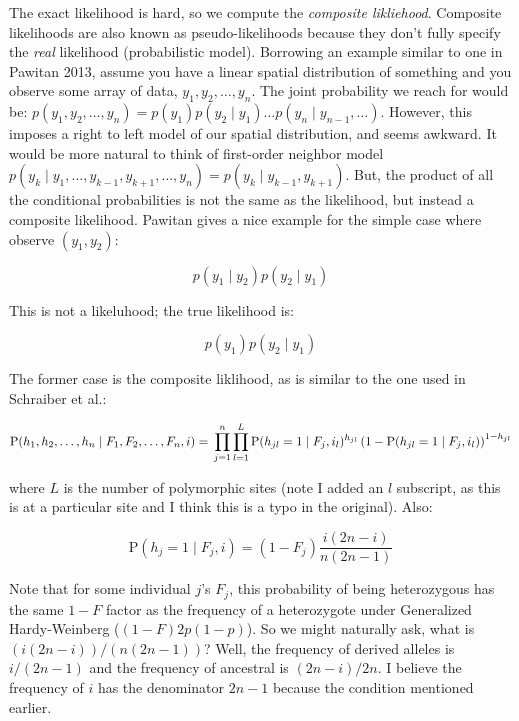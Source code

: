 \documentclass[12pt]{article}\usepackage[]{graphicx}\usepackage[]{color}
\begin{document}
The exact likelihood is hard, so we compute the \emph{composite
  likliehood}. Composite likelihoods are also known as pseudo-likelihoods
because they don't fully specify the \emph{real} likelihood
(probabilistic model). Borrowing an example similar to one in Pawitan
2013, assume you have a linear spatial distribution of something and
you observe some array of data, $y_1, y_2, \ldots, y_n$. The joint
probability we reach for would be: $p(y_1, y_2, \ldots, y_n) = p(y_1)
p(y_2 \mid y_1) \ldots p(y_n \mid y_{n-1}, \ldots)$. However, this
imposes a right to left model of our spatial distribution, and seems
awkward. It would be more natural to think of first-order neighbor
model $p(y_k \mid y_1, \ldots, y_{k-1}, y_{k+1}, \ldots, y_n) = p(y_k
\mid y_{k-1}, y_{k+1})$. But, the product of all the conditional
probabilities is not the same as the likelihood, but instead a
composite likelihood. Pawitan gives a nice example for the simple case
where observe $(y_1, y_2)$:

$$ p(y_1 \mid y_2) p(y_2 \mid y_1)$$

This is not a likeluhood; the true likelihood is:

$$ p(y_1) p(y_2 \mid y_1) $$

The former case is the composite liklihood, as is similar to the one
used in Schraiber et al.:

\begin{equation} \label{eq:schraiber:06}
\text{P}(h_1, h_2, \ldots, h_n \mid F_1, F_2, \ldots, F_n, i) = \\
\prod_{j=1}^n \prod_{l=1}^L \text{P}(h_{jl} = 1 \mid F_j, i_l)^{h_{jl}} \left( 1 - \text{P}(h_{jl} = 1 \mid F_j, i_l)\right)^{1 - h_{jl}}
\end{equation}

where $L$ is the number of polymorphic sites (note I added an $l$
subscript, as this is at a particular site and I think this is a typo
in the original). Also:

\begin{equation} \label{eq:schraiber:07}
\text{P}(h_{j} = 1 \mid F_j, i) = (1 - F_j) \frac{i (2n - i)} {n (2n - 1)}
\end{equation}

Note that for some individual $j$'s $F_j$, this probability of being
heterozygous has the same $1 - F$ factor as the frequency of a
heterozygote under Generalized Hardy-Weinberg ($(1-F)2p(1 - p)$). So
we might naturally ask, what is $(i(2n - i))/(n(2n - 1))$? Well, the
frequency of derived alleles is $i/(2n - 1)$ and the frequency of
ancestral is $(2n - i)/2n$. I believe the frequency of $i$ has the
denominator $2n - 1$ because the condition mentioned earlier.




\end{document}

